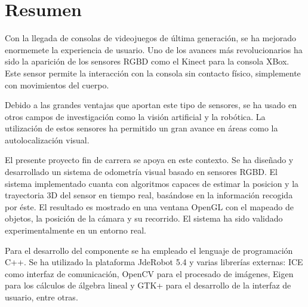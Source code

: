 \chapter*{Resumen}

Con la llegada de consolas de videojuegos de última generación, se ha mejorado enormemete la experiencia de usuario. Uno de los avances más revolucionarios ha sido la aparición de los sensores RGBD como el Kinect para la consola XBox. Este sensor permite la interacción con la consola sin contacto físico, simplemente con movimientos del cuerpo.

Debido a las grandes ventajas que aportan este tipo de sensores, se ha usado en otros campos de investigación como la visión artificial y la robótica. La utilización de estos sensores ha permitido un gran avance en áreas como la autolocalización visual.

El presente proyecto fin de carrera se apoya en este contexto. Se ha diseñado y desarrollado un sistema de odometría visual basado en sensores RGBD. El sistema implementado cuanta con algoritmos capaces de estimar la posicion y la trayectoria 3D del sensor en tiempo real, basándose en la información recogida por éste. El resultado es mostrado en una ventana OpenGL con el mapeado de objetos, la posición de la cámara y su recorrido. El sistema ha sido validado experimentalmente en un entorno real.

Para el desarrollo del componente se ha empleado el lenguaje de programación C++. Se ha utilizado la plataforma JdeRobot 5.4 y varias librerías externas: ICE como interfaz de comunicación, OpenCV para el procesado de imágenes, Eigen para los cálculos de álgebra lineal y GTK+ para el desarrollo de la interfaz de usuario, entre otras.
